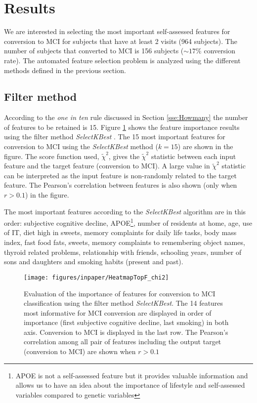 \documentclass[preprint,12pt]{elsarticle}
\begin{document}
\section{Results}
\label{se:res}

We are interested in selecting the most important self-assessed features for conversion to MCI for subjects that have at least 2 visits (964 subjects). The number of subjects that converted to MCI is 156 subjects ($\sim 17\%$ conversion rate). The automated feature selection problem is analyzed using the different methods defined in the previous section. 

\subsection{Filter method}
According to the \emph{one in ten} rule discussed in Section \ref{sse:Howmany}
the number of features to be retained is 15. Figure \ref{fig:rf14} shows the feature importance results using the filter method \emph{SelectKBest} \cite{scikit-learn}. The 15 most important features for conversion to MCI using the \emph{SelectKBest} method ($k=15$) are shown in the figure. The score function used, $\tilde{\chi}^2$, gives the $\tilde{\chi}^2$ statistic between each input feature and the target feature (conversion to MCI). A large value in $\tilde{\chi}^2$ statistic can be interpreted as the input feature is non-randomly related to the target feature. The Pearson's correlation between features is also shown (only when $r >0.1$) in the figure. 

The most important features according to the \emph{SelectKBest} algorithm are in this order: subjective cognitive decline, APOE\footnote{APOE is not a self-assessed feature but it provides valuable information and allows us to have an idea about the importance of lifestyle and self-assessed variables compared to genetic variables}, number of residents at home, age, use of IT, diet high in sweets, memory complaints for daily life tasks, body mass index, fast food fats, sweets, memory complaints to remembering object names, thyroid related problems, relationship with friends, schooling years, number of sons and daughters and smoking habits (present and past).

\begin{figure}[!htb]
        \centering
        \texttt{[image: figures/inpaper/HeatmapTopF\_chi2]}
        \caption{Evaluation of the importance of features for conversion to MCI classification using the filter method \emph{SelectKBest}. The 14 features most informative for MCI conversion are displayed in order of importance (first subjective cognitive decline, last smoking) in both axis. Conversion to MCI is displayed in the last row. The Pearson's correlation among all pair of features including the output target (conversion to MCI) are shown when $r>0.1$ } 
        \label{fig:rf14}
\end{figure}
\end{document}
